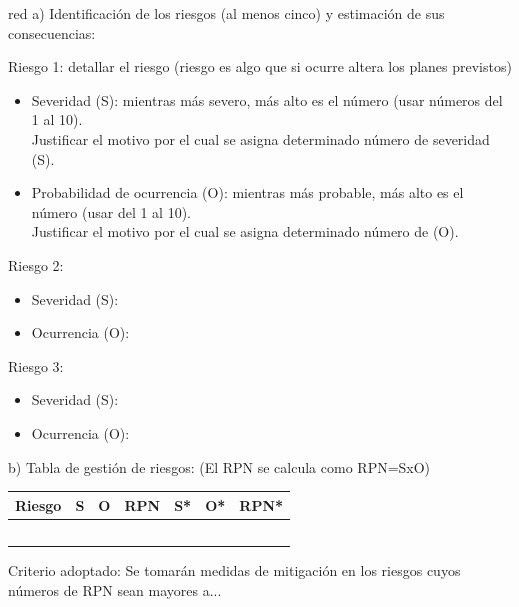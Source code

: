 \documentclass[11pt]{charter}
\begin{document}
\begin{consigna}{red}
a) Identificación de los riesgos (al menos cinco) y estimación de sus consecuencias:
 
Riesgo 1: detallar el riesgo (riesgo es algo que si ocurre altera los planes previstos)
\begin{itemize}
\item Severidad (S): mientras más severo, más alto es el número (usar números del 1 al 10).\\
Justificar el motivo por el cual se asigna determinado número de severidad (S).
\item Probabilidad de ocurrencia (O): mientras más probable, más alto es el número (usar del 1 al 10).\\
Justificar el motivo por el cual se asigna determinado número de (O). 
\end{itemize}   

Riesgo 2:
\begin{itemize}
\item Severidad (S): 
\item Ocurrencia (O):
\end{itemize}

Riesgo 3:
\begin{itemize}
\item Severidad (S): 
\item Ocurrencia (O):
\end{itemize}


b) Tabla de gestión de riesgos:      (El RPN se calcula como RPN=SxO)

\begin{table}[htpb]
\centering
\begin{tabularx}{\linewidth}{@{}|X|c|c|c|c|c|c|@{}}
\hline
\rowcolor[HTML]{C0C0C0} 
Riesgo & S & O & RPN & S* & O* & RPN* \\ \hline
       &   &   &     &    &    &      \\ \hline
       &   &   &     &    &    &      \\ \hline
       &   &   &     &    &    &      \\ \hline
       &   &   &     &    &    &      \\ \hline
       &   &   &     &    &    &      \\ \hline
\end{tabularx}%
\end{table}

Criterio adoptado: 
Se tomarán medidas de mitigación en los riesgos cuyos números de RPN sean mayores a...


\end{consigna}
\end{document}
